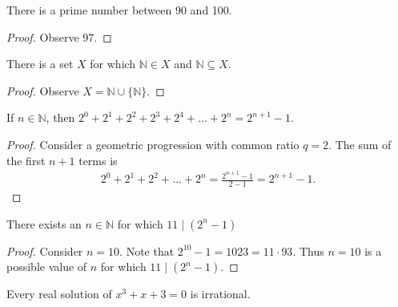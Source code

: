 \documentclass{exam}
\begin{document}
\begin{proposition}{7.17}
    There is a prime number between 90 and 100.
\end{proposition}

\begin{proof}
    Observe 97.
\end{proof}

\begin{proposition}{7.18}
    There is a set $X$ for which $\mathbb N\in X$ and $\mathbb N\subseteq X$.
\end{proposition}

\begin{proof}
    Observe $X = \mathbb N \cup \{\mathbb N\}$.
\end{proof}

\begin{proposition}{7.19}
    If $n\in\mathbb N$, then $2^0+2^1+2^2+2^3+2^4+\dots+2^n=2^{n+1}-1$.
\end{proposition}

\begin{proof}
    Consider a geometric progression with common ratio $q = 2$. The sum of the first $n+1$ terms is
    \begin{align*}
        2^0 + 2^1 + 2^2 +\dots+2^n = \frac{2^{n+1} - 1}{2-1} = 2^{n+1}-1.
    \end{align*}
\end{proof}

\begin{proposition}{7.20}
    There exists an $n\in\mathbb N$ for which $11\mid(2^n-1)$
\end{proposition}

\begin{proof}
    Consider $n = 10$. Note that $2^10-1 = 1023 = 11\cdot93$. Thus $n=10$ is a possible value of $n$ for which $11\mid(2^n-1)$.
\end{proof}

\begin{proposition}{7.21}
    Every real solution of $x^3+x+3=0$ is irrational.
\end{proposition}
\end{document}
